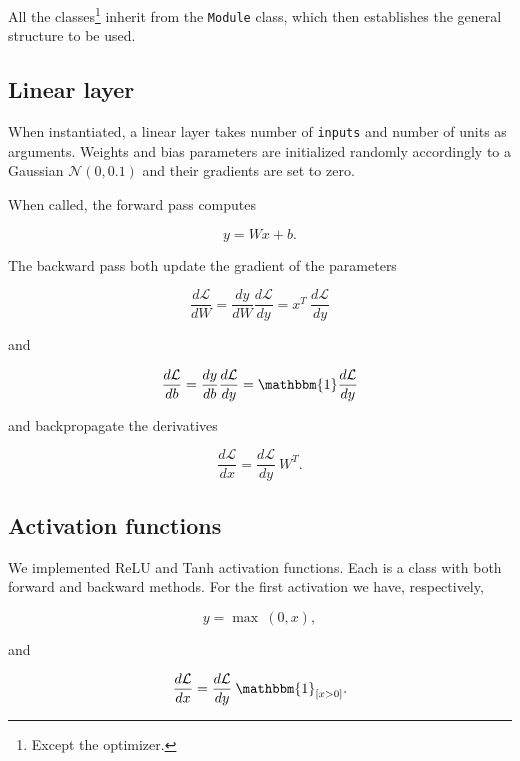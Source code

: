 \documentclass[11pt,conference,compsocconf]{IEEEtran}
\begin{document}
All the classes\footnote{Except the optimizer.} inherit from the \texttt{Module} class, which then establishes the general structure to be used.

\subsection{Linear layer}

When instantiated, a linear layer takes number of \texttt{inputs} and number of units as arguments. Weights and bias parameters are initialized randomly accordingly to a Gaussian $\mathcal{N}(0, 0.1)$ and their gradients are set to zero.

When called, the forward pass computes

\begin{equation*}
    y = W x + b.
\end{equation*}

The backward pass both update the gradient of the parameters 

\begin{equation*}
    \frac{d\mathcal{L}}{dW} = \frac{dy}{dW} \frac{d\mathcal{L}}{dy} = x^{T}\:\frac{d\mathcal{L}}{dy} 
\end{equation*}

and 

\begin{equation*}
    \frac{d\mathcal{L}}{db} = \frac{dy}{db} \frac{d\mathcal{L}}{dy} = \mathbbm{1} \frac{d\mathcal{L}}{dy} 
\end{equation*}

and backpropagate the derivatives

\begin{equation*}
    \frac{d\mathcal{L}}{dx} = \frac{d\mathcal{L}}{dy}\: W^{T}.
\end{equation*}


\subsection{Activation functions}

We implemented ReLU and Tanh activation functions. Each is a class with both forward and backward methods. For the first activation we have, respectively,

\begin{equation*}
    y = \max\:(0, x),
\end{equation*}

and 

\begin{equation*}
    \frac{d\mathcal{L}}{dx} = \frac{d\mathcal{L}}{dy} \: \mathbbm{1}_{[x > 0]}.
\end{equation*}
\end{document}
